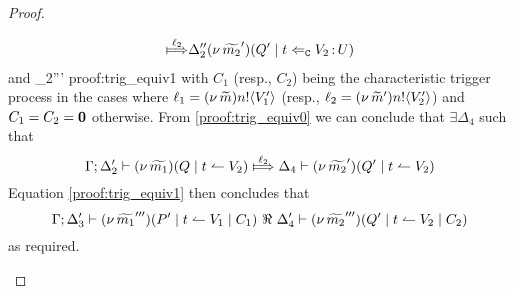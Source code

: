 \begin{proof}
\begin{enumerate}[1.]
\begin{enumerate}
\begin{eqnarray}
							{\Hby{\ell_2}}
							{\Delta_2''}{\newsp{\widetilde{m_2}'}{Q' \Par \ftrigger{t}{V_2}{U}}}
							\label{proof:trig_equiv0}
							\end{eqnarray}
							and
							{\fwb}
							{\Delta_2'''}{}
							{proof:trig_equiv1}
							with $C_1$ (resp., $C_2$) being the characteristic trigger process
							in the cases where $\ell_1 = (\nu\, \widetilde{m}) n ! \langle V_1' \rangle$ (resp., $\ell_2 = (\nu\, \widetilde{m}') n ! \langle V_2' \rangle$)
							and $C_1 = C_2 = \mathbf{0}$ otherwise.
							From \eqref{proof:trig_equiv0} we can conclude that $\exists \Delta_4$ such that
						\[
							\horel{\Gamma}{\Delta_2'}{\newsp{\widetilde{m_1}}{Q \Par \ntrigger{t}{V_2}}}
							{\Hby{\ell_2}}
							{\Delta_4}{\newsp{\widetilde{m_2}'}{Q' \Par \ntrigger{t}{V_2}}}
						\]
							Equation \eqref{proof:trig_equiv1} then concludes that
						\[
							\Gamma; \Delta_3' \vdash (\nu\, \widetilde{m_1}''')(P' \;|\; t \leftharpoonup V_1 \;|\; C_1) \ \Re\  \Delta_4' \vdash{(\nu\, \widetilde{m_2}''')(Q' \;|\;t \leftharpoonup V_2 \;|\;C_2)}
						\]
							as required.


\end{enumerate}
\end{enumerate}
\end{proof}
